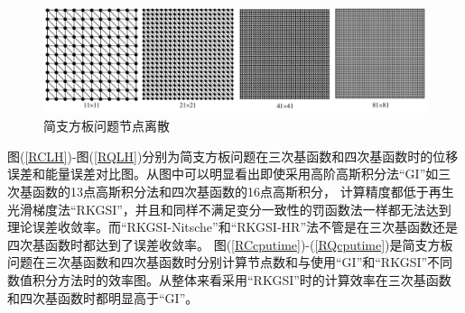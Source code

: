 \begin{figure}[H]
\centering
      \includegraphics[scale=0.4]{figure/PHR/R/rectangularmsh.png}
    \caption{简支方板问题节点离散}\label{rectangularmsh}
\end{figure}
 图(\ref{RCLH})-图(\ref{RQLH})分别为简支方板问题在三次基函数和四次基函数时的位移误差和能量误差对比图。从图中可以明显看出即使采用高阶高斯积分法“GI”如三次基函数的13点高斯积分法和四次基函数的16点高斯积分，
计算精度都低于再生光滑梯度法“RKGSI”，并且和同样不满足变分一致性的罚函数法一样都无法达到理论误差收敛率。而“RKGSI-Nitsche”和“RKGSI-HR”法不管是在三次基函数还是四次基函数时都达到了误差收敛率。
图(\ref{RCcputime})-(\ref{RQcputime})是简支方板问题在三次基函数和四次基函数时分别计算节点数和与使用“GI”和“RKGSI”不同数值积分方法时的效率图。从整体来看采用“RKGSI”时的计算效率在三次基函数和四次基函数时都明显高于“GI”。  
